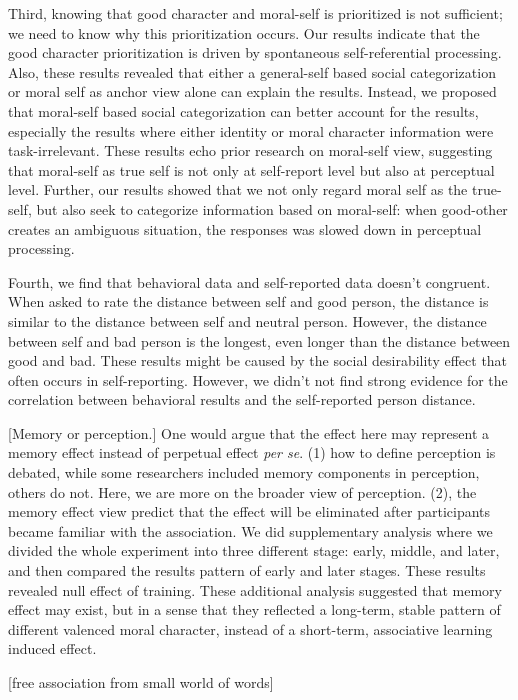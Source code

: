 \documentclass[
  man]{apa6}
\begin{document}
Third, knowing that good character and moral-self is prioritized is not sufficient; we need to know why this prioritization occurs. Our results indicate that the good character prioritization is driven by spontaneous self-referential processing. Also, these results revealed that either a general-self based social categorization or moral self as anchor view alone can explain the results. Instead, we proposed that moral-self based social categorization can better account for the results, especially the results where either identity or moral character information were task-irrelevant. These results echo prior research on moral-self view, suggesting that moral-self as true self is not only at self-report level but also at perceptual level. Further, our results showed that we not only regard moral self as the true-self, but also seek to categorize information based on moral-self: when good-other creates an ambiguous situation, the responses was slowed down in perceptual processing.

Fourth, we find that behavioral data and self-reported data doesn't congruent. When asked to rate the distance between self and good person, the distance is similar to the distance between self and neutral person. However, the distance between self and bad person is the longest, even longer than the distance between good and bad. These results might be caused by the social desirability effect that often occurs in self-reporting. However, we didn't not find strong evidence for the correlation between behavioral results and the self-reported person distance.

{[}Memory or perception.{]} One would argue that the effect here may represent a memory effect instead of perpetual effect \emph{per se}. (1) how to define perception is debated, while some researchers included memory components in perception, others do not. Here, we are more on the broader view of perception. (2), the memory effect view predict that the effect will be eliminated after participants became familiar with the association. We did supplementary analysis where we divided the whole experiment into three different stage: early, middle, and later, and then compared the results pattern of early and later stages. These results revealed null effect of training. These additional analysis suggested that memory effect may exist, but in a sense that they reflected a long-term, stable pattern of different valenced moral character, instead of a short-term, associative learning induced effect.

{[}free association from small world of words{]}
\end{document}

